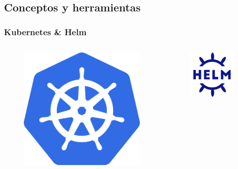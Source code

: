 \documentclass{beamer}
\begin{document}
\subsection{Conceptos y herramientas}
\begin{frame}
    \frametitle{Kubernetes \& Helm}
    \begin{columns}
        \begin{column}{0.5\textwidth}
            \begin{figure}
                \includegraphics[scale=0.15]{figuras/kubernetes-logo}
            \end{figure}
        \end{column}
        \begin{column}{0.5\textwidth}
            \begin{figure}
                \includegraphics[scale=0.18]{figuras/helm-logo}

\end{figure}
\end{column}
\end{columns}
\end{frame}
\end{document}
